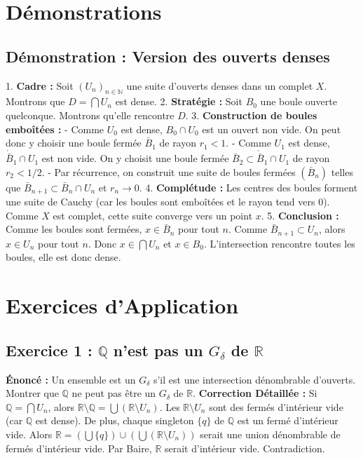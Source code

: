 \documentclass[11pt,a4paper]{article}
\begin{document}
\section{Démonstrations}

\subsection{Démonstration : Version des ouverts denses}

1. \textbf{Cadre :} Soit $(U_n)_{n \in \mathbb{N}}$ une suite d'ouverts denses dans un complet $X$. Montrons que $D = \bigcap U_n$ est dense.
2. \textbf{Stratégie :} Soit $B_0$ une boule ouverte quelconque. Montrons qu'elle rencontre $D$.
3. \textbf{Construction de boules emboîtées :}
   - Comme $U_0$ est dense, $B_0 \cap U_0$ est un ouvert non vide. On peut donc y choisir une boule fermée $\bar{B}_1$ de rayon $r_1 < 1$.
   - Comme $U_1$ est dense, $\mathring{\bar{B}}_1 \cap U_1$ est non vide. On y choisit une boule fermée $\bar{B}_2 \subset \mathring{\bar{B}}_1 \cap U_1$ de rayon $r_2 < 1/2$.
   - Par récurrence, on construit une suite de boules fermées $(\bar{B}_n)$ telles que $\bar{B}_{n+1} \subset \bar{B}_n \cap U_n$ et $r_n \to 0$.
4. \textbf{Complétude :} Les centres des boules forment une suite de Cauchy (car les boules sont emboîtées et le rayon tend vers 0). Comme $X$ est complet, cette suite converge vers un point $x$.
5. \textbf{Conclusion :} Comme les boules sont fermées, $x \in \bar{B}_n$ pour tout $n$.
   Comme $\bar{B}_{n+1} \subset U_n$, alors $x \in U_n$ pour tout $n$.
   Donc $x \in \bigcap U_n$ et $x \in B_0$. L'intersection rencontre toutes les boules, elle est donc dense.

\section{Exercices d'Application}

\subsection{Exercice 1 : $\mathbb{Q}$ n'est pas un $G_\delta$ de $\mathbb{R}$}
\textbf{Énoncé :} Un ensemble est un $G_\delta$ s'il est une intersection dénombrable d'ouverts. Montrer que $\mathbb{Q}$ ne peut pas être un $G_\delta$ de $\mathbb{R}$.
\textbf{Correction Détaillée :}
Si $\mathbb{Q} = \bigcap U_n$, alors $\mathbb{R} \setminus \mathbb{Q} = \bigcup ( \mathbb{R} \setminus U_n )$. Les $\mathbb{R} \setminus U_n$ sont des fermés d'intérieur vide (car $\mathbb{Q}$ est dense). De plus, chaque singleton $\{q\}$ de $\mathbb{Q}$ est un fermé d'intérieur vide. Alors $\mathbb{R} = (\bigcup \{q\}) \cup (\bigcup (\mathbb{R} \setminus U_n))$ serait une union dénombrable de fermés d'intérieur vide. Par Baire, $\mathbb{R}$ serait d'intérieur vide. Contradiction.
\end{document}
